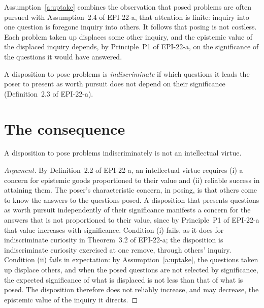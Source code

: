 \documentclass{situationist-preprint}
\begin{document}
Assumption~\ref{a:uptake} combines the observation that posed problems are often pursued with Assumption~2.4 of EPI-22-a, that attention is finite: inquiry into one question is foregone inquiry into others. It follows that posing is not costless. Each problem taken up displaces some other inquiry, and the epistemic value of the displaced inquiry depends, by Principle~P1 of EPI-22-a, on the significance of the questions it would have answered.

\begin{definition}\label{d:indisc}
A disposition to pose problems is \emph{indiscriminate} if which questions it leads the poser to present as worth pursuit does not depend on their significance (Definition~2.3 of EPI-22-a).
\end{definition}

\section{The consequence}

\begin{theorem}\label{t:pose}
A disposition to pose problems indiscriminately is not an intellectual virtue.
\end{theorem}

\begin{proof}[Argument]
By Definition~2.2 of EPI-22-a, an intellectual virtue requires (i) a concern for epistemic goods proportioned to their value and (ii) reliable success in attaining them. The poser's characteristic concern, in posing, is that others come to know the answers to the questions posed. A disposition that presents questions as worth pursuit independently of their significance manifests a concern for the answers that is not proportioned to their value, since by Principle~P1 of EPI-22-a that value increases with significance. Condition (i) fails, as it does for indiscriminate curiosity in Theorem~3.2 of EPI-22-a; the disposition is indiscriminate curiosity exercised at one remove, through others' inquiry. Condition (ii) fails in expectation: by Assumption~\ref{a:uptake}, the questions taken up displace others, and when the posed questions are not selected by significance, the expected significance of what is displaced is not less than that of what is posed. The disposition therefore does not reliably increase, and may decrease, the epistemic value of the inquiry it directs.
\end{proof}
\end{document}
